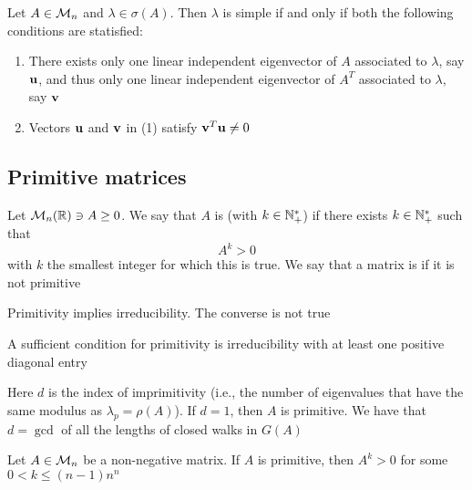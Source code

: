 \documentclass[aspectratio=169]{beamer}
\begin{document}
\begin{frame}
\begin{lemma}\label{lemma:Schur_LI_evectors}
Let $A\in \mathcal{M}_n$ and $\lambda\in \sigma(A)$. 
Then $\lambda$ is simple if and only if both the following conditions are statisfied:
\begin{enumerate}
     \item There exists only one linear independent eigenvector of $A$ associated to $\lambda$, say $\mathbf{u}$, and thus only one linear independent eigenvector of $A^T$ associated to $\lambda$, say $\mathbf{v}$
     \item Vectors $\mathbf{u}$ and $\mathbf{v}$ in (1) satisfy $\mathbf{v}^T\mathbf{u}\neq 0$
\end{enumerate}
\end{lemma}
\end{frame}


\subsection{Primitive matrices}
\label{sec:primitivity}


\begin{frame}
\begin{definition}
Let $\mathcal{M}_n(\mathbb{R})\ni A\geq 0$.
We say that $A$ is  (with  $k\in \mathbb{N}_{+}^{*}$) if there exists $k\in \mathbb{N}_{+}^{*}$ such that 
\[
A^k>0
\]
with $k$ the smallest integer for which this is true.
We say that a matrix is  if it is not primitive
\end{definition}
\vfill
\begin{remark}
Primitivity implies irreducibility. The converse is not true
\end{remark}
\end{frame}


\begin{frame}
\begin{theorem}
A sufficient condition for primitivity is irreducibility with at least one positive diagonal entry
\end{theorem}
\vfill
Here $d$ is the index of imprimitivity (i.e., the number of eigenvalues that have the same modulus as $\lambda_p=\rho(A)$). If $d=1$, then $A$ is primitive. We have that $d=\gcd$ of all the lengths of closed walks in $G(A)$
\vfill
\begin{theorem}
Let $A\in \mathcal{M}_n$ be a non-negative matrix. If $A$ is primitive, then $A^k>0$ for some $0<k\leq (n-1)n^n$
\end{theorem}
\end{frame}
\end{document}
